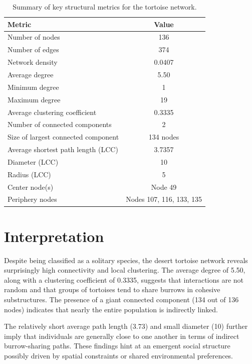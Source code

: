 \documentclass[12pt]{report}
\begin{document}
\begin{table}[h!]
    \centering
    \begin{tabular}{|l|c|}
        \hline
        \textbf{Metric} & \textbf{Value} \\\hline
        Number of nodes & 136 \\\hline
        Number of edges & 374 \\\hline
        Network density & 0.0407 \\\hline
        Average degree & 5.50 \\\hline
        Minimum degree & 1 \\\hline
        Maximum degree & 19 \\\hline
        Average clustering coefficient & 0.3335 \\\hline
        Number of connected components & 2 \\\hline
        Size of largest connected component & 134 nodes \\\hline
        Average shortest path length (LCC) & 3.7357 \\\hline
        Diameter (LCC) & 10 \\\hline
        Radius (LCC) & 5 \\\hline
        Center node(s) & Node 49 \\\hline
        Periphery nodes & Nodes 107, 116, 133, 135 \\\hline
    \end{tabular}
    \caption{Summary of key structural metrics for the tortoise network.}
    \label{tab:network-metrics}
\end{table}

\section*{Interpretation}

Despite being classified as a solitary species, the desert tortoise network reveals surprisingly high connectivity and local clustering. The average degree of 5.50, along with a clustering coefficient of 0.3335, suggests that interactions are not random and that groups of tortoises tend to share burrows in cohesive substructures. The presence of a giant connected component (134 out of 136 nodes) indicates that nearly the entire population is indirectly linked.

The relatively short average path length (3.73) and small diameter (10) further imply that individuals are generally close to one another in terms of indirect burrow-sharing paths. These findings hint at an emergent social structure possibly driven by spatial constraints or shared environmental preferences.
\end{document}
